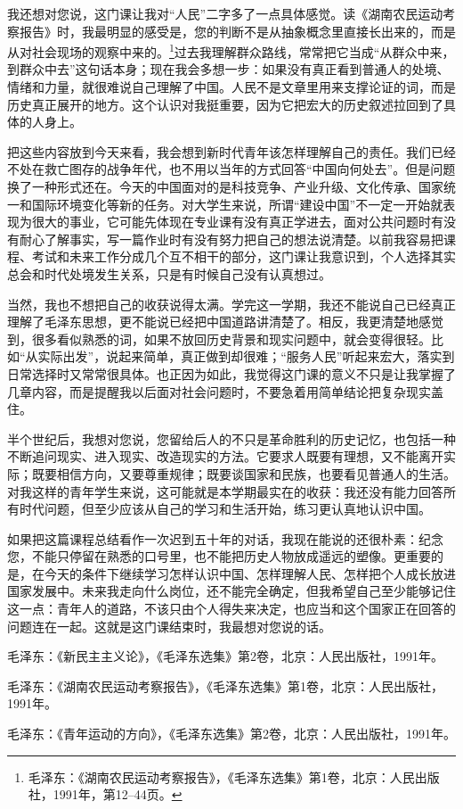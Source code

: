 \documentclass[12pt,a4paper]{ctexart}
\begin{document}
{我还想对您说，这门课让我对“人民”二字多了一点具体感觉。读《湖南农民运动考察报告》时，我最明显的感受是，您的判断不是从抽象概念里直接长出来的，而是从对社会现场的观察中来的。\footnote{毛泽东：《湖南农民运动考察报告》，《毛泽东选集》第1卷，北京：人民出版社，1991年，第12--44页。}过去我理解群众路线，常常把它当成“从群众中来，到群众中去”这句话本身；现在我会多想一步：如果没有真正看到普通人的处境、情绪和力量，就很难说自己理解了中国。人民不是文章里用来支撑论证的词，而是历史真正展开的地方。这个认识对我挺重要，因为它把宏大的历史叙述拉回到了具体的人身上。

把这些内容放到今天来看，我会想到新时代青年该怎样理解自己的责任。我们已经不处在救亡图存的战争年代，也不用以当年的方式回答“中国向何处去”。但是问题换了一种形式还在。今天的中国面对的是科技竞争、产业升级、文化传承、国家统一和国际环境变化等新的任务。对大学生来说，所谓“建设中国”不一定一开始就表现为很大的事业，它可能先体现在专业课有没有真正学进去，面对公共问题时有没有耐心了解事实，写一篇作业时有没有努力把自己的想法说清楚。以前我容易把课程、考试和未来工作分成几个互不相干的部分，这门课让我意识到，个人选择其实总会和时代处境发生关系，只是有时候自己没有认真想过。

当然，我也不想把自己的收获说得太满。学完这一学期，我还不能说自己已经真正理解了毛泽东思想，更不能说已经把中国道路讲清楚了。相反，我更清楚地感觉到，很多看似熟悉的词，如果不放回历史背景和现实问题中，就会变得很轻。比如“从实际出发”，说起来简单，真正做到却很难；“服务人民”听起来宏大，落实到日常选择时又常常很具体。也正因为如此，我觉得这门课的意义不只是让我掌握了几章内容，而是提醒我以后面对社会问题时，不要急着用简单结论把复杂现实盖住。

半个世纪后，我想对您说，您留给后人的不只是革命胜利的历史记忆，也包括一种不断追问现实、进入现实、改造现实的方法。它要求人既要有理想，又不能离开实际；既要相信方向，又要尊重规律；既要谈国家和民族，也要看见普通人的生活。对我这样的青年学生来说，这可能就是本学期最实在的收获：我还没有能力回答所有时代问题，但至少应该从自己的学习和生活开始，练习更认真地认识中国。

如果把这篇课程总结看作一次迟到五十年的对话，我现在能说的还很朴素：纪念您，不能只停留在熟悉的口号里，也不能把历史人物放成遥远的塑像。更重要的是，在今天的条件下继续学习怎样认识中国、怎样理解人民、怎样把个人成长放进国家发展中。未来我走向什么岗位，还不能完全确定，但我希望自己至少能够记住这一点：青年人的道路，不该只由个人得失来决定，也应当和这个国家正在回答的问题连在一起。这就是这门课结束时，我最想对您说的话。

\vspace{1em}

\noindent [1] 毛泽东：《新民主主义论》，《毛泽东选集》第2卷，北京：人民出版社，1991年。

\noindent [2] 毛泽东：《湖南农民运动考察报告》，《毛泽东选集》第1卷，北京：人民出版社，1991年。

\noindent [3] 毛泽东：《青年运动的方向》，《毛泽东选集》第2卷，北京：人民出版社，1991年。

}
\end{document}
